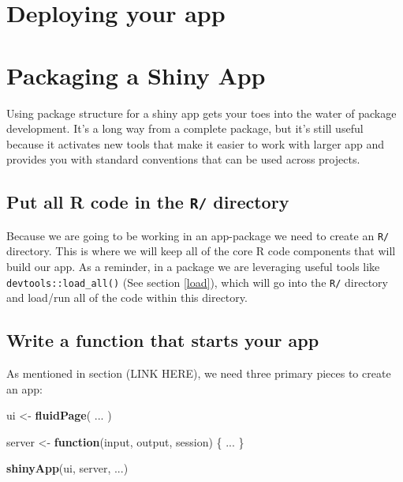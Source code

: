 \documentclass[
]{book}
\newenvironment{Shaded}{\begin{snugshade}}{\end{snugshade}}
\newcommand{\ControlFlowTok}[1]{\textcolor[rgb]{0.13,0.29,0.53}{\textbf{#1}}}
\newcommand{\KeywordTok}[1]{\textcolor[rgb]{0.13,0.29,0.53}{\textbf{#1}}}
\newcommand{\NormalTok}[1]{#1}
\newcommand{\StringTok}[1]{\textcolor[rgb]{0.31,0.60,0.02}{#1}}
\begin{document}
\hypertarget{deploying-your-app}{%
\section{Deploying your app}\label{deploying-your-app}}

\hypertarget{packaging-a-shiny-app}{%
\section{Packaging a Shiny App}\label{packaging-a-shiny-app}}

Using package structure for a shiny app gets your toes into the water of package development. It's a long way from a complete package, but it's still useful because it activates new tools that make it easier to work with larger app and provides you with standard conventions that can be used across projects.

\hypertarget{put-all-r-code-in-the-r-directory}{%
\subsection{\texorpdfstring{Put all R code in the \texttt{R/} directory}{Put all R code in the R/ directory}}\label{put-all-r-code-in-the-r-directory}}

Because we are going to be working in an app-package we need to create an \texttt{R/} directory. This is where we will keep all of the core R code components that will build our app. As a reminder, in a package we are leveraging useful tools like \texttt{devtools::load\_all()} (See section \ref{load}), which will go into the \texttt{R/} directory and load/run all of the code within this directory.

\hypertarget{write-a-function-that-starts-your-app}{%
\subsection{Write a function that starts your app}\label{write-a-function-that-starts-your-app}}

As mentioned in section (LINK HERE), we need three primary pieces to create an app:

\begin{Shaded}
\begin{Highlighting}[]
\NormalTok{ui <-}\StringTok{ }\KeywordTok{fluidPage}\NormalTok{(}
\NormalTok{  ...}
\NormalTok{)}

\NormalTok{server <-}\StringTok{ }\ControlFlowTok{function}\NormalTok{(input, output, session) \{}
\NormalTok{  ...}
\NormalTok{\}}

\KeywordTok{shinyApp}\NormalTok{(ui, server, ...)}
\end{Highlighting}
\end{Shaded}
\end{document}
